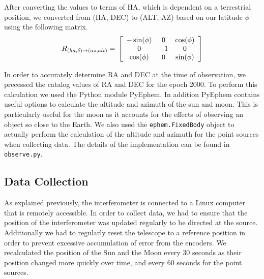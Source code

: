 \documentclass{article}
\begin{document}
  After converting the values to terms of HA, which is dependent on a
  terrestrial position, we converted from (HA, DEC) to (ALT, AZ) based on our
  latitude $\phi$ using the following matrix.
   \[ {R}_{(ha , \delta ) \rightarrow (az, alt)} = \\
       \left [ \begin{array}{ccc}
           -\sin(\phi) & 0 & \cos(\phi) \\
           0 & -1 & 0 \\
           \cos(\phi) & 0 & \sin(\phi) \\
       \end{array} \right ]  \]

  In order to accurately determine RA and DEC at the time of observation, we
  precessed the catalog values of RA and DEC for the epoch 2000. To perform this
  calculation we used the Python module PyEphem. In addition PyEphem
  contains useful options to calculate the altitude and azimuth of the sun and
  moon. This is particularly useful for the moon as it accounts for the effects
  of observing an object so close to the Earth. We also used the
  \lstinline{ephem.FixedBody} object to actually perform the calculation of
  the altitude and azimuth for the point sources when collecting data. The
  details of the implementation can be found in \lstinline{observe.py}.

  \subsection{Data Collection}
  As explained previously, the interferometer is connected to a Linux computer
  that is remotely accessible. In order to collect data, we had to ensure that
  the position of the interferometer was updated regularly to be directed at the
  source. Additionally we had to regularly reset the telescope to a reference
  position in order to prevent excessive accumulation of error from the
  encoders. We recalculated the position of the Sun and the Moon every 30
  seconds as their position changed more quickly over time, and every 60 seconds for
  the point sources.
\end{document}
